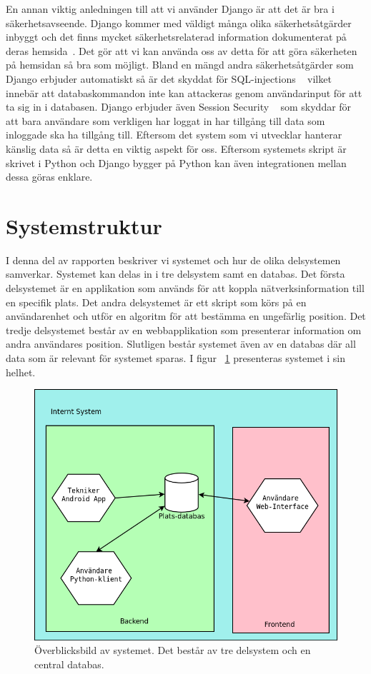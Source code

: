 \documentclass[a4paper,12pt]{article}
\begin{document}
 En annan viktig anledningen till att vi använder Django är att det är bra i säkerhetsavseende. Django kommer med väldigt många olika säkerhetsåtgärder inbyggt och det finns mycket säkerhetsrelaterad information dokumenterat på deras hemsida~\cite{securityInDjango}. Det gör att vi kan använda oss av detta för att göra säkerheten på hemsidan så bra som möjligt. Bland en mängd andra säkerhetsåtgärder som Django erbjuder automatiskt så är det skyddat för SQL-injections ~\cite{securityInDjango} vilket innebär att databaskommandon inte kan attackeras genom användarinput för att ta sig in i databasen. Django erbjuder även Session Security ~\cite{securityInDjango} som skyddar för att bara användare som verkligen har loggat in har tillgång till data som inloggade ska ha tillgång till.
 Eftersom det system som vi utvecklar hanterar känslig data så är detta en viktig aspekt för oss.
 Eftersom systemets skript är skrivet i Python och Django bygger på Python kan även integrationen mellan dessa göras enklare.

 \section{Systemstruktur}\label{sysstruktur}
 I denna del av rapporten beskriver vi systemet och hur de olika delsystemen samverkar.
 Systemet kan delas in i tre delsystem samt en databas. Det första delsystemet är en applikation som används för att koppla nätverksinformation till en specifik plats. Det andra delsystemet är ett skript som körs på en användarenhet och utför en algoritm för att bestämma en ungefärlig position. Det tredje delsystemet består av en webbapplikation som presenterar information om andra användares position. Slutligen består systemet även av en databas där all data som är relevant för systemet sparas.
 I figur ~\ref{fig:systemStruktur} presenteras systemet i sin helhet.

 \begin{figure}[H]
 	\includegraphics[width=15cm]{media/systemStruktur.png}
 	\caption{Överblicksbild av systemet. Det består av tre delsystem och en central databas.}
 	\label{fig:systemStruktur}
 \end{figure}
\end{document}
